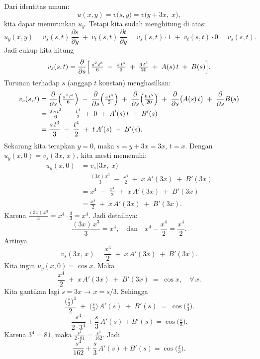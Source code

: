 \documentclass[a4paper]{article}
\theoremstyle{definition}
\begin{document}
\begin{enumerate}
\begin{enumerate}
   Dari identitas umum:
   \[
   u(x,y) 
   = v\bigl(s,y\bigr)
   = v\bigl(y + 3x,\;x\bigr),
   \]
   kita dapat menurunkan \(u_{y}\). Tetapi kita sudah menghitung di atas:  
   \[
   u_{y}(x,y) = v_{s}(s,t)\,\frac{\partial s}{\partial y} \;+\; v_{t}(s,t)\,\frac{\partial t}{\partial y} 
   = v_{s}(s,t)\cdot 1 \;+\; v_{t}(s,t)\cdot 0 
   = v_{s}(s,t).
   \]
   Jadi cukup kita hitung
   \[
   v_{s}(s,t) = \frac{\partial}{\partial s}
   \Bigl[\,
   \tfrac{s^{2}\,t^{3}}{6}
   \;-\;\tfrac{s\,t^{4}}{2}
   \;+\;\tfrac{9\,t^{5}}{20}
   \;+\;A(s)\,t
   \;+\;B(s)\Bigr].
   \]
   Turunan terhadap \(s\) (anggap \(t\) konstan) menghasilkan:
   \[
   \begin{aligned}
   v_{s}(s,t) 
   &= \frac{\partial}{\partial s}\Bigl(\tfrac{s^{2}\,t^{3}}{6}\Bigr)
     \;-\;\frac{\partial}{\partial s}\Bigl(\tfrac{s\,t^{4}}{2}\Bigr)
     \;+\; \frac{\partial}{\partial s}\Bigl(\tfrac{9\,t^{5}}{20}\Bigr)
     \;+\; \frac{\partial}{\partial s}\bigl(A(s)\,t\bigr)
     \;+\; \frac{\partial}{\partial s}B(s) \\
   &= \tfrac{2\,s\,t^{3}}{6} 
     \;-\; \tfrac{t^{4}}{2} 
     \;+\; 0 
     \;+\; A'(s)\,t 
     \;+\; B'(s) \\
   &= \frac{s\,t^{3}}{3} 
     \;-\; \frac{t^{4}}{2} 
     \;+\; t\,A'(s) 
     \;+\; B'(s).
   \end{aligned}
   \]
   Sekarang kita terapkan \(y=0\), maka \(s = y+3x = 3x\), \(t=x\). Dengan \(u_{y}(x,0) = v_{s}(3x,\,x)\), kita mesti memenuhi:
  \begin{align*}
  u_{y}(x,0)
  &= v_{s}\bigl(3x,\;x\bigr) \\
  &= \frac{(3x)\,x^{3}}{3} \;-\; \frac{x^{4}}{2} \;+\; x\,A'(3x) \;+\; B'(3x) \\
  &= x^{4} \;-\; \frac{x^{4}}{2} \;+\; x\,A'(3x) \;+\; B'(3x) \\
  &= \frac{x^{4}}{2} \;+\; x\,A'(3x) \;+\; B'(3x).
  \end{align*}
   Karena \(\frac{(3x)\,x^{3}}{3} = x^{4}\cdot\frac{3}{3} = x^{4}\). Jadi detailnya:
   \[
   \frac{(3x)\,x^{3}}{3} = x^{4}, 
   \quad\text{dan}\quad
   x^{4} - \frac{x^{4}}{2} = \frac{x^{4}}{2}.
   \]
   Artinya
   \[
   v_{s}(3x,\,x)
   = \frac{x^{4}}{2} \;+\; x\,A'(3x) \;+\; B'(3x).
   \]
   Kita ingin \(u_{y}(x,0) = \cos x\). Maka
   \[
   \frac{x^{4}}{2} \;+\; x\,A'(3x) \;+\; B'(3x) 
   \;=\; \cos x,
   \quad\forall\,x.
   \]
   Kita gantikan lagi \(s=3x\) → \(x = s/3\). Sehingga
   \[
   \frac{\bigl(\tfrac{s}{3}\bigr)^{4}}{2} 
   \;+\; \bigl(\tfrac{s}{3}\bigr)\,A'(s) 
   \;+\; B'(s) 
   \;=\; \cos\!\bigl(\tfrac{s}{3}\bigr).
   \]
   \[
   \frac{s^{4}}{2\cdot 3^{4}} 
   + \frac{s}{3}\,A'(s) 
   + B'(s) 
   = \cos\!\bigl(\tfrac{s}{3}\bigr).
   \]
   Karena \(3^{4} = 81\), maka \(\tfrac{s^{4}}{2\cdot 81} = \tfrac{s^{4}}{162}\). Jadi
   \[
   \frac{s^{4}}{162} + \frac{s}{3}\,A'(s) + B'(s) 
   = \cos\!\bigl(\tfrac{s}{3}\bigr).
   \]



\end{enumerate}
\end{enumerate}
\end{document}
